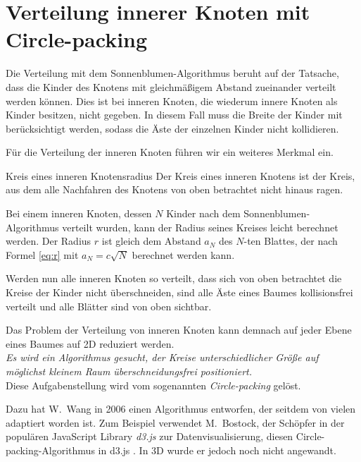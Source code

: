 \section{Verteilung innerer Knoten mit Circle-packing}
\label{sec:Circle-packing}

Die Verteilung mit dem Sonnenblumen-Algorithmus beruht auf der Tatsache, dass die Kinder des Knotens mit gleichmäßigem Abstand zueinander verteilt werden können. Dies ist bei inneren Knoten, die wiederum innere Knoten als Kinder besitzen, nicht gegeben. In diesem Fall muss die Breite der Kinder mit berücksichtigt werden, sodass die Äste der einzelnen Kinder nicht kollidieren.

Für die Verteilung der inneren Knoten führen wir ein weiteres Merkmal ein.

\begin{defbox}{Kreis eines inneren Knotens}{radius}
   Der Kreis eines inneren Knotens ist der Kreis, aus dem alle Nachfahren des Knotens von oben betrachtet nicht hinaus ragen.
\end{defbox}

Bei einem inneren Knoten, dessen $N$ Kinder nach dem Sonnenblumen-Algorithmus verteilt wurden, kann der Radius seines Kreises leicht berechnet werden. Der Radius $r$ ist gleich dem Abstand $a_N$ des $N$-ten Blattes, der nach Formel \ref{eq:r} mit $a_N = c \sqrt{N}$ berechnet werden kann.

Werden nun alle inneren Knoten so verteilt, dass sich von oben betrachtet die Kreise der Kinder nicht überschneiden, sind alle Äste eines Baumes kollisionsfrei verteilt und alle Blätter sind von oben sichtbar.

Das Problem der Verteilung von inneren Knoten kann demnach auf jeder Ebene eines Baumes auf 2D reduziert werden.\\

\textit{Es wird ein Algorithmus gesucht, der Kreise unterschiedlicher Größe auf möglichst kleinem Raum überschneidungsfrei positioniert.}\\

Diese Aufgabenstellung wird vom sogenannten \textit{Circle-packing} gelöst.

Dazu hat W.\ Wang in \cite{wang2006visualization} 2006 einen Algorithmus entworfen, der seitdem von vielen adaptiert worden ist. Zum Beispiel verwendet M.\ Bostock, der Schöpfer in der populären JavaScript Library \textit{d3.js} zur Datenvisualisierung, diesen Circle-packing-Algorithmus in d3.js \cite{bostock2017abetter}. In 3D wurde er jedoch noch nicht angewandt.

